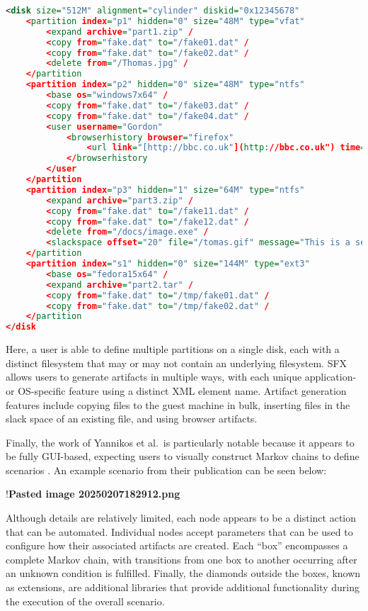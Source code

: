 \documentclass[letterpaper,12pt]{report}
\begin{document}
\begin{lstlisting}[language=XML]
<disk size="512M" alignment="cylinder" diskid="0x12345678"
    <partition index="p1" hidden="0" size="48M" type="vfat"
        <expand archive="part1.zip" /
        <copy from="fake.dat" to="/fake01.dat" /
        <copy from="fake.dat" to="/fake02.dat" /
        <delete from="/Thomas.jpg" /
    </partition
    <partition index="p2" hidden="0" size="48M" type="ntfs"
        <base os="windows7x64" /
        <copy from="fake.dat" to="/fake03.dat" /
        <copy from="fake.dat" to="/fake04.dat" /
        <user username="Gordon"
            <browserhistory browser="firefox"
                <url link="[http://bbc.co.uk"](http://bbc.co.uk") time="13:14:00 1 Jan 2013" /
            </browserhistory
        </user
    </partition
    <partition index="p3" hidden="1" size="64M" type="ntfs"
        <expand archive="part3.zip" /
        <copy from="fake.dat" to="/fake11.dat" /
        <copy from="fake.dat" to="/fake12.dat" /
        <delete from="/docs/image.exe" /
        <slackspace offset="20" file="/tomas.gif" message="This is a secret message" /
    </partition
    <partition index="s1" hidden="0" size="144M" type="ext3"
        <base os="fedora15x64" /
        <expand archive="part2.tar" /
        <copy from="fake.dat" to="/tmp/fake01.dat" /
        <copy from="fake.dat" to="/tmp/fake02.dat" /
    </partition
</disk
\end{lstlisting}

Here, a user is able to define multiple partitions on a single disk,
each with a distinct filesystem that may or may not contain an
underlying filesystem. SFX allows users to generate artifacts in
multiple ways, with each unique application- or OS-specific feature
using a distinct XML element name. Artifact generation features include
copying files to the guest machine in bulk, inserting files in the slack
space of an existing file, and using browser artifacts.

Finally, the work of Yannikos et al.~is particularly notable because it
appears to be fully GUI-based, expecting users to visually construct
Markov chains to define scenarios
\cite{yannikosDataCorporaDigital2014}. An example scenario from
their publication can be seen below:

!\textbf{Pasted image 20250207182912.png}

Although details are relatively limited, each node appears to be a
distinct action that can be automated. Individual nodes accept
parameters that can be used to configure how their associated artifacts
are created. Each ``box'' encompasses a complete Markov chain, with
transitions from one box to another occurring after an unknown condition
is fulfilled. Finally, the diamonds outside the boxes, known as
extensions, are additional libraries that provide additional
functionality during the execution of the overall scenario.
\end{document}
